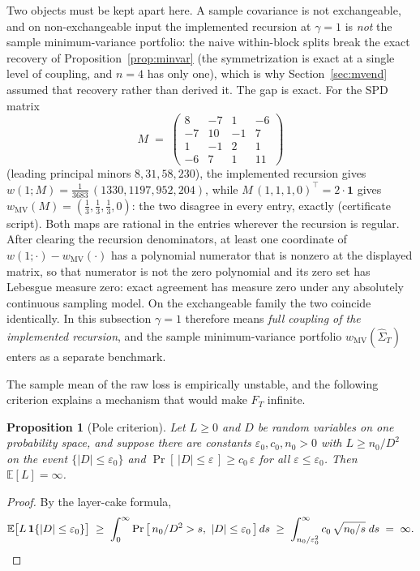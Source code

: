 \documentclass[11pt]{article}
\newtheorem{proposition}{Proposition}
\theoremstyle{remark}
\newcommand{\E}{\mathbb{E}}
\begin{document}
Two objects must be kept apart here. A sample covariance is not
exchangeable, and on non-exchangeable input the implemented recursion at
$\gamma = 1$ is \emph{not} the sample minimum-variance portfolio: the
naive within-block splits break the exact recovery of
Proposition~\ref{prop:minvar} (the symmetrization is exact at a single
level of coupling, and $n = 4$ has only one), which is why
Section~\ref{sec:mvend} assumed that recovery rather than derived it. The
gap is exact. For the SPD matrix
\[
  M \;=\; \begin{pmatrix}
    8 & -7 & 1 & -6 \\ -7 & 10 & -1 & 7 \\ 1 & -1 & 2 & 1 \\ -6 & 7 & 1 & 11
  \end{pmatrix}
\]
(leading principal minors $8, 31, 58, 230$), the implemented recursion
gives $w(1; M) = \tfrac{1}{3683}\,(1330, 1197, 952, 204)$, while
$M\,(1,1,1,0)^\top = 2\cdot\mathbf{1}$ gives
$w_{\mathrm{MV}}(M) = (\tfrac13, \tfrac13, \tfrac13, 0)$: the two
disagree in every entry, exactly (certificate script). Both maps are
rational in the entries wherever the recursion is regular. After
clearing the recursion denominators, at least one coordinate of
$w(1;\cdot) - w_{\mathrm{MV}}(\cdot)$ has a polynomial numerator that is
nonzero at the displayed matrix, so that numerator is not the zero
polynomial and its zero set has Lebesgue measure zero: exact agreement
has measure zero under any absolutely continuous sampling model. On the
exchangeable family the two coincide identically. In this subsection $\gamma = 1$
therefore means \emph{full coupling of the implemented recursion}, and
the sample minimum-variance portfolio
$w_{\mathrm{MV}}(\widehat\Sigma_T)$ enters as a separate benchmark.

The sample mean of the raw loss is empirically unstable, and the
following criterion explains a mechanism that would make $F_T$ infinite.

\begin{proposition}[Pole criterion]
\label{prop:pole}
Let $L \ge 0$ and $D$ be random variables on one probability space, and
suppose there are constants $\varepsilon_0, c_0, n_0 > 0$ with
$L \ge n_0 / D^2$ on the event $\{|D| \le \varepsilon_0\}$ and
$\Pr[\,|D| \le \varepsilon\,] \ge c_0\,\varepsilon$ for all
$\varepsilon \le \varepsilon_0$. Then $\E[L] = \infty$.
\end{proposition}
\begin{proof}
By the layer-cake formula,
\[
  \E\big[L\,\mathbf{1}\{|D| \le \varepsilon_0\}\big]
  \;\ge\; \int_0^\infty \Pr\big[\,n_0/D^2 > s,\ |D| \le \varepsilon_0\,\big]\,ds
  \;\ge\; \int_{n_0/\varepsilon_0^2}^{\infty} c_0\,\sqrt{n_0/s}\;ds
  \;=\; \infty. \qedhere
\]
\end{proof}
\end{document}
